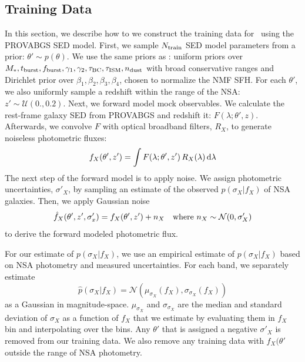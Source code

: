 \subsection{Training Data} \label{sec:training}
In this section, we describe how to we construct the training data for
\sedflow~using the PROVABGS SED model.
First, we sample $N_{\rm train}$ SED model parameters from a prior: $\theta'\sim p(\theta)$. 
We use the same priors as \cite{hahn2022}: uniform priors over $M_*,
t_{\rm burst}, f_{\rm burst}, \gamma_1, \gamma_2, \tau_{\rm BC}, \tau_{\rm ISM},
n_{\rm dust}$ with broad conservative ranges and Dirichlet prior over $\beta_1,
\beta_2, \beta_3, \beta_4$, chosen to normalize the NMF SFH.
For each $\theta'$, we also uniformly sample a redshift within the range of the
NSA: $z' \sim \mathcal{U}(0., 0.2)$. 
Next, we forward model mock observables. 
We calculate the rest-frame galaxy SED from PROVABGS and redshift it: 
$F(\lambda;\theta', z)$. 
Afterwards, we convolve $F$ with optical broadband filters, $R_X$, to generate
noiseless photometric fluxes:
\begin{equation}
    f_X(\theta', z') = \int F(\lambda;\theta', z') \, R_X(\lambda) \, {\rm d}\lambda
\end{equation}
The next step of the forward model is to apply noise. 
We assign photometric uncertainties, $\sigma'_X$, by sampling an estimate of
the observed $p(\sigma_X | f_X)$ of NSA galaxies. 
Then, we apply Gaussian noise
\begin{equation} \label{eq:noise} 
    \hat{f}_X(\theta', z', \sigma'_x) = f_X(\theta', z') + n_X  \quad {\rm where}~n_X \sim \mathcal{N}(0, \sigma'_X)
\end{equation}
to derive the forward modeled photometric flux.

For our estimate of $p(\sigma_X | f_X)$, we use an empirical estimate of
$p(\sigma_X | f_X)$ based on NSA photometry and measured uncertainties. 
For each band, we separately estimate  
\begin{equation}
    \hat{p}(\sigma_X | f_X) = \mathcal{N}( \mu_{\sigma_X}(f_X), \sigma_{\sigma_X}(f_X))
\end{equation}
as a Gaussian in magnitude-space. 
$\mu_{\sigma_X}$ and $\sigma_{\sigma_X}$ are the median and standard deviation
of $\sigma_X$ as a function of $f_X$ that we estimate by evaluating them in
$f_X$ bin and interpolating over the bins. 
Any $\theta'$ that is assigned a negative $\sigma'_X$ is removed from our
training data. 
We also remove any training data with $f_X(\theta'$ outside the range of NSA
photometry. 

